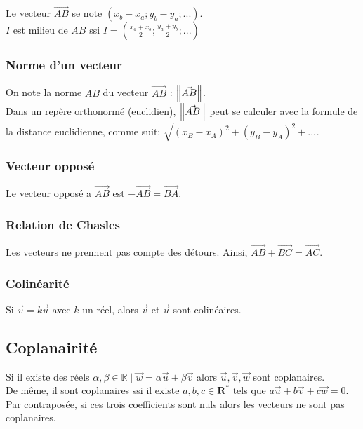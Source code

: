 \documentclass{article}
\begin{document}
Le vecteur $\Vec{AB}$ se note $(x_b - x_a ; y_b - y_a ; ...)$.\\
$I$ est milieu de $AB$ ssi $I=(\frac{x_a+x_b}{2};\frac{y_a+y_b}{2};...)$



\subsubsection{Norme d'un vecteur}
On note la norme $AB$ du vecteur $\Vec{AB}$ : $\norm{\Vec{AB}}$.\\
Dans un repère orthonormé (euclidien), $\norm{\Vec{AB}}$ peut se calculer avec la formule de la distance euclidienne, comme suit: $\sqrt{(x_B-x_A)^2+ (y_B-y_A)^2+...}$.

\subsubsection{Vecteur opposé}
Le vecteur opposé a $\Vec{AB}$ est $-\Vec{AB} = \Vec{BA}$.

\subsubsection{Relation de Chasles}
Les vecteurs ne prennent pas compte des détours. Ainsi, $\Vec{AB}+\Vec{BC}=\Vec{AC}$.

\subsubsection{Colinéarité}
Si $\Vec{v} = k\Vec{u}$ avec $k$ un réel, alors $\Vec{v}$ et $\Vec{u}$ sont colinéaires.

\subsection{Coplanairité}
Si il existe des réels $\alpha,\beta\in\mathbb{R}\mid\Vec{w}=\alpha\Vec{u}+\beta\Vec{v}$ alors $\Vec{u},\Vec{v},\Vec{w}$ sont coplanaires.\\
De même, il sont coplanaires ssi il existe $a,b,c\in\mathbf{R^*}$ tels que $a\Vec{u}+b\Vec{v}+c\Vec{w}=0$. Par contraposée, si ces trois coefficients sont nuls alors les vecteurs ne sont pas coplanaires.
\end{document}
